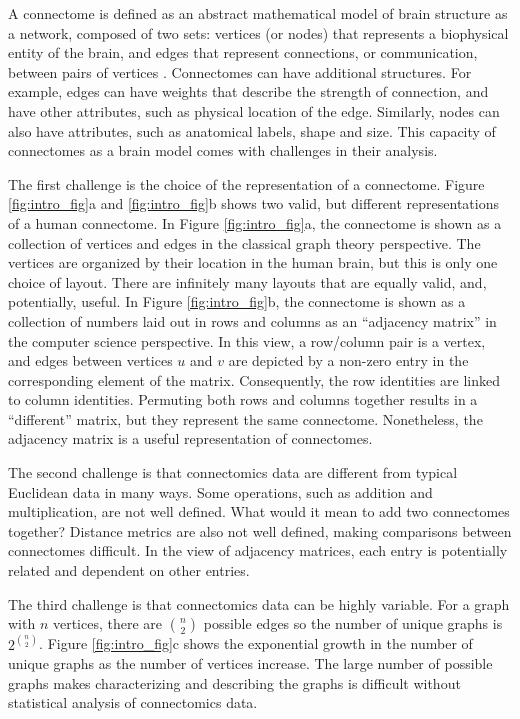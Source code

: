 A connectome is defined as an abstract mathematical model of brain structure as a network, composed of two sets: vertices (or nodes) that represents a biophysical entity of the brain, and edges that represent connections, or communication, between pairs of vertices \citep{sporns2005human,Hagmann2005,vogelstein2019connectal}. Connectomes can have additional structures. For example, edges can have weights that describe the strength of connection, and have other attributes, such as physical location of the edge. Similarly, nodes can also have attributes, such as anatomical labels, shape and size. This capacity of connectomes as a brain model comes with challenges in their analysis. 

The first challenge is the choice of the representation of a connectome. Figure \ref{fig:intro_fig}a and \ref{fig:intro_fig}b shows two valid, but different representations of a human connectome. In Figure \ref{fig:intro_fig}a, the connectome is shown as a collection of vertices and edges in the classical graph theory perspective.
The vertices are organized by their location in the human brain, but this is only one choice of layout. There are infinitely many layouts that are equally valid, and, potentially, useful.
In Figure \ref{fig:intro_fig}b, the connectome is shown as a collection of numbers laid out in rows and columns as an ``adjacency matrix'' in the computer science perspective. In this view, a row/column pair is a vertex, and edges between vertices $u$ and $v$ are depicted by a non-zero entry in the corresponding element of the matrix. Consequently, the row identities are linked to column identities. Permuting both rows and columns together results in a ``different'' matrix, but they represent the same connectome. Nonetheless, the adjacency matrix is a useful representation of connectomes.

The second challenge is that connectomics data are different from typical Euclidean data in many ways. Some operations, such as addition and multiplication, are not well defined. What would it mean to add two connectomes together? Distance metrics are also not well defined, making comparisons between connectomes difficult. In the view of adjacency matrices, each entry is potentially related and dependent on other entries.

The third challenge is that connectomics data can be highly variable. For a graph with $n$ vertices, there are $n \choose 2$ possible edges so the number of unique graphs is $2^{n \choose 2}$. Figure \ref{fig:intro_fig}c shows the exponential growth in the number of unique graphs as the number of vertices increase. The large number of possible graphs makes characterizing and describing the graphs is difficult without statistical analysis of connectomics data.


